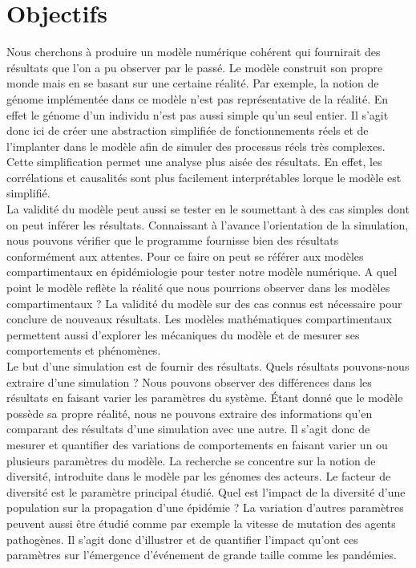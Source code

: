 \chapter{Objectifs} \label{ch:objectifs}

Nous cherchons à produire un modèle numérique cohérent qui fournirait des résultats que l'on a pu observer par le passé. Le modèle construit son propre monde mais en se basant sur une certaine réalité. Par exemple, la notion de génome implémentée dans ce modèle n'est pas représentative de la réalité. En effet le génome d'un individu n'est pas aussi simple qu'un seul entier. Il s'agit donc ici de créer une abstraction simplifiée de fonctionnements réels et de l'implanter dans le modèle afin de simuler des processus réels très complexes. Cette simplification permet une analyse plus aisée des résultats. En effet, les corrélations et causalités sont plus facilement interprétables lorque le modèle est simplifié.\\

La validité du modèle peut aussi se tester en le soumettant à des cas simples dont on peut inférer les résultats. Connaissant à l'avance l'orientation de la simulation, nous pouvons vérifier que le programme fournisse bien des résultats conformément aux attentes. Pour ce faire on peut se référer aux modèles compartimentaux en épidémiologie pour tester notre modèle numérique. A quel point le modèle reflète la réalité que nous pourrions observer dans les modèles compartimentaux ? La validité du modèle sur des cas connus est nécessaire pour conclure de nouveaux résultats. Les modèles mathématiques compartimentaux permettent aussi d'explorer les mécaniques du modèle et de mesurer ses comportements et phénomènes.\\

Le but d'une simulation est de fournir des résultats. Quels résultats pouvons-nous extraire d'une simulation ? Nous pouvons observer des différences dans les résultats en faisant varier les paramètres du système. Étant donné que le modèle possède sa propre réalité, nous ne pouvons extraire des informations qu'en comparant des résultats d'une simulation avec une autre. Il s'agit donc de mesurer et quantifier des variations de comportements en faisant varier un ou plusieurs paramètres du modèle. La recherche se concentre sur la notion de diversité, introduite dans le modèle par les génomes des acteurs. Le facteur de diversité est le paramètre principal étudié. Quel est l'impact de la diversité d'une population sur la propagation d'une épidémie ? La variation d'autres paramètres peuvent aussi être étudié comme par exemple la vitesse de mutation des agents pathogènes. Il s'agit donc d'illustrer et de quantifier l'impact qu'ont ces paramètres sur l'émergence d'événement de grande taille comme les pandémies.\\

